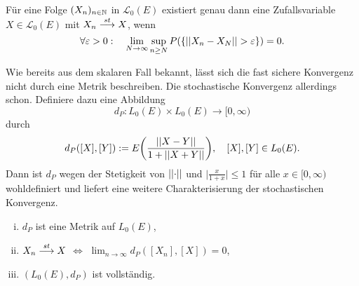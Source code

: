 \begin{theorem}
    Für eine Folge $(X_n)_{n \in \mathbb{N}}$ in $\mathcal{L}_0(E)$ existiert genau dann eine Zufallsvariable $X \in \mathcal{L}_0(E)$ mit $X_n \overset{st}{\longrightarrow} X$, wenn
    $$
        \forall \varepsilon > 0 : \quad \lim_{N \to \infty}\sup_{n\geq N}P(\{\lvert\lvert X_n - X_N \rvert\rvert > \varepsilon \}) = 0. 
    $$
\end{theorem}

Wie bereits aus dem skalaren Fall bekannt, lässt sich die fast sichere Konvergenz nicht durch eine Metrik beschreiben. Die stochastische Konvergenz allerdings schon. 
Definiere dazu eine Abbildung 
    $$d_P : L_0(E) \times L_0(E) \to [0,\infty)$$
 durch
\begin{align}
    d_P([X],[Y]) := E\bigg(\frac{\lvert\lvert X-Y \rvert\rvert}{1+\lvert\lvert X+Y \rvert\rvert}\bigg), \quad [X], [Y] \in L_0(E).  
\end{align}
Dann ist $d_P$ wegen der Stetigkeit von $\lvert\lvert \cdot \rvert\rvert$ und $\big\lvert\frac{x}{1+x}\big\rvert \leq 1$ für alle $x \in [0, \infty)$ wohldefiniert
und liefert eine weitere Charakterisierung der stochastischen Konvergenz. 
\begin{proposition}
    \begin{enumerate}[(i)]
        \item $d_P$ ist eine Metrik auf $L_0(E)$,
        \item $X_n \overset{st}{\longrightarrow} X$ $\iff$ $\lim_{n \to \infty}d_P([X_n], [X]) = 0$,
        \item $(L_0(E), d_P)$ ist vollständig. 
    \end{enumerate}
\end{proposition}
